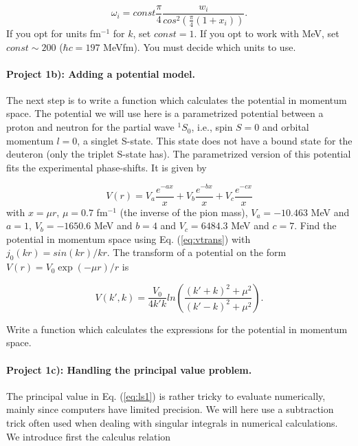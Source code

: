 \documentclass[%
oneside,                 %
final,                   %
10pt]{article}
\begin{document}
\begin{equation*}
            \omega_i= const\frac{\pi}{4}\frac{w_i}{cos^2\left(\frac{\pi}{4}(1+x_i)\right)}.
         \end{equation*}
If you opt for units fm$^{-1}$ for $k$, set $const=1$. If you opt to work
with MeV, set $const\sim 200$ ($\hbar c=197$ MeVfm).
You must decide which units to use.

\paragraph{Project 1b): Adding a potential model.}
The next step is to write a function which calculates the potential
in momentum space. The potential we will use here is a parametrized  potential
between a proton and neutron for the partial wave  $^1S_0$, 
i.e., spin $S=0$ and
orbital momentum $l=0$, a singlet S-state. 
This state does not have a bound state
for the deuteron (only the triplet S-state has). 
The parametrized version of this potential fits the experimental
phase-shifts. It is given by

\begin{equation}
  V(r)=V_a \frac{e^{-ax}}{x}+V_b \frac{e^{-bx}}{x}+V_c \frac{e^{-cx}}{x}
  \label{eq:realp}
\end{equation}
with $x=\mu r$, $\mu=0.7$ fm$^{-1}$ (the inverse of the pion mass),
$V_a=-10.463$ MeV and $a=1$, $V_b=-1650.6$ MeV and $b=4$ and
$V_c=6484.3$ MeV and $c=7$. 
Find the potential in momentum space using Eq. (\ref{eq:vtrans})
with $j_0(kr)=sin(kr)/kr$. 
The transform of a potential on the form 
$V(r)=V_0\exp{(-\mu r)}/r$ is

\begin{equation}
     V(k',k)= \frac{V_0}{4k'k}ln\left(\frac{(k'+k)^2+\mu^2}{(k'-k)^2+\mu^2}\right).
\end{equation}

Write a function which calculates the expressions for the
potential in momentum space.

\paragraph{Project 1c): Handling the principal value problem.}
The principal value in Eq. (\ref{eq:ls1}) is rather tricky
to evaluate numerically, mainly since computers have limited
precision. We will here use a subtraction trick often used
when dealing with singular integrals in numerical calculations.
We introduce first the calculus relation
\end{document}
